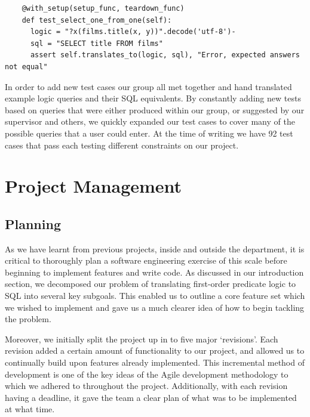 \documentclass[a4paper, 11pt]{article}
\begin{document}
    \begin{verbatim}
    @with_setup(setup_func, teardown_func)
    def test_select_one_from_one(self):
      logic = "?x(films.title(x, y))".decode('utf-8')-
      sql = "SELECT title FROM films"
      assert self.translates_to(logic, sql), "Error, expected answers not equal"
    \end{verbatim}

    In order to add new test cases our group all met together and hand translated 
    example logic queries and their SQL equivalents. By constantly adding new tests 
    based on queries that were either produced within our group, or suggested by our 
    supervisor and others, we quickly expanded our test cases to cover many of the 
    possible queries that a user could enter. At the time of writing we have 92 test 
    cases that pass each testing different constraints on our project.


 

\section{Project Management}
  \subsection{Planning}
    As we have learnt from previous projects, inside and outside the
    department, it is critical to thoroughly plan a software engineering
    exercise of this scale before beginning to implement features and write
    code. As discussed in our introduction section, we decomposed our problem
    of translating first-order predicate logic to SQL into several key
    subgoals. This enabled us to outline a core feature set which we wished to
    implement and gave us a much clearer idea of how to begin tackling the
    problem.

    Moreover, we initially split the project up in to five major `revisions'.
    Each revision added a certain amount of functionality to our project, and
    allowed us to continually build upon features already implemented. This
    incremental method of development is one of the key ideas of the Agile
    development methodology to which we adhered to throughout the project.
    \cite{agilemanifesto} Additionally, with each revision having a
    deadline, it gave the team a clear plan of what was to be implemented at
    what time.
\end{document}
